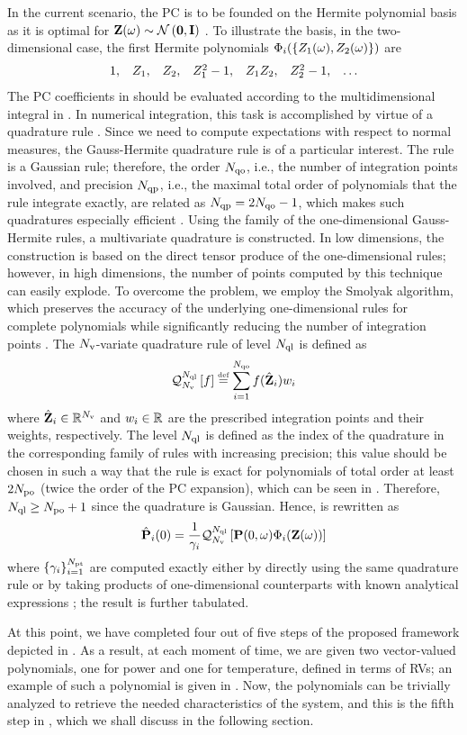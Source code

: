 In the current scenario, the PC is to be founded on the Hermite polynomial basis as it is optimal for $\vZ(\o) \sim \normal{\vZero}{\mI}$ \cite{xiu2002}. To illustrate the basis, in the two-dimensional case, the first Hermite polynomials $\Phi_i(\{ Z_1(\omega), Z_2(\omega) \})$ are
\[
  \begin{array}{lllllll}
  1, & Z_1, & Z_2, & Z_1^2 - 1, & Z_1 Z_2, & Z_2^2 - 1, & \dotsc
  \end{array}
\]
The PC coefficients in  should be evaluated according to the multidimensional integral in . In numerical integration, this task is accomplished by virtue of a quadrature rule \cite{press2007}. Since we need to compute expectations with respect to normal measures, the Gauss-Hermite quadrature rule is of a particular interest. The rule is a Gaussian rule; therefore, the order $N_\text{qo}$, i.e., the number of integration points involved, and precision $N_\text{qp}$, i.e., the maximal total order of polynomials that the rule integrate exactly, are related as $N_\text{qp} = 2 N_\text{qo} - 1$, which makes such quadratures especially efficient \cite{heiss2008}. Using the family of the one-dimensional Gauss-Hermite rules, a multivariate quadrature is constructed. In low dimensions, the construction is based on the direct tensor produce of the one-dimensional rules; however, in high dimensions, the number of points computed by this technique can easily explode. To overcome the problem, we employ the Smolyak algorithm, which preserves the accuracy of the underlying one-dimensional rules for complete polynomials while significantly reducing the number of integration points \cite{eldred2009, maitre2010, heiss2008}. The ${N_\text{v}}$-variate quadrature rule of level $N_\text{ql}$ is defined as
\[
  \mathcal{Q}_{{N_\text{v}}}^{N_\text{ql}}\left[f\right] \stackrel{\text{\tiny def}}{=} \sum_{i = 1}^{N_\text{qo}} f(\hat{\mathbf{Z}}_i) w_i
\]
where $\hat{\mathbf{Z}}_i \in \mathbb{R}^{N_\text{v}}$ and $w_i \in \mathbb{R}$ are the prescribed integration points and their weights, respectively. The level $N_\text{ql}$ is defined as the index of the quadrature in the corresponding family of rules with increasing precision; this value should be chosen in such a way that the rule is exact for polynomials of total order at least $2 {N_\text{po}}$ (twice the order of the PC expansion), which can be seen in  \cite{eldred2009}. Therefore, $N_\text{ql} \geq {N_\text{po}} + 1$ since the quadrature is Gaussian. Hence,  is rewritten as
\[
  \hat{\mathbf{P}}_i(0) = \frac{1}{\gamma_i} \mathcal{Q}_{{N_\text{v}}}^{N_\text{ql}}\left[\mathbf{P}(0, \omega) \Phi_i(\mathbf{Z}(\omega))\right]
\]
where $\{ \gamma_i \}_{i = 1}^{{N_\text{pt}}}$ are computed exactly either by directly using the same quadrature rule or by taking products of one-dimensional counterparts with known analytical expressions \cite{xiu2010}; the result is further tabulated.

At this point, we have completed four out of five steps of the proposed framework depicted in . As a result, at each moment of time, we are given two vector-valued polynomials, one for power and one for temperature, defined in terms of RVs; an example of such a polynomial is given in . Now, the polynomials can be trivially analyzed to retrieve the needed characteristics of the system, and this is the fifth step in , which we shall discuss in the following section.
